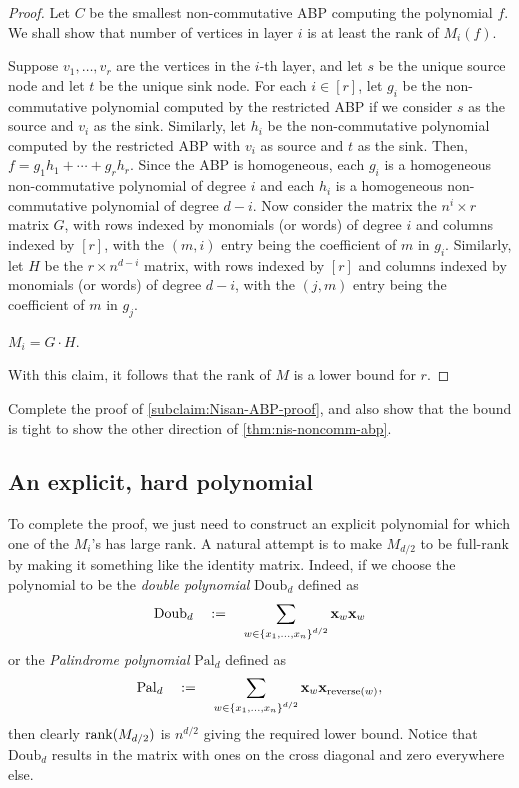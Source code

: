 \begin{proof}
Let $C$ be the smallest non-commutative ABP computing the polynomial $f$. We shall show that number of vertices in layer $i$ is at least the rank of $M_i(f)$. 

Suppose $v_1,\ldots, v_r$ are the vertices in the $i$-th layer, and let $s$ be the unique source node and let $t$ be the unique sink node.
For each $i \in [r]$, let $g_i$ be the non-commutative polynomial computed by the restricted ABP if we consider $s$ as the source and $v_i$ as the sink.
Similarly, let $h_i$ be the non-commutative polynomial computed by the restricted ABP with $v_i$ as source and $t$ as the sink.
Then, $f = g_1 h_1 + \cdots + g_r h_r$.
Since the ABP is homogeneous, each $g_i$ is a homogeneous non-commutative polynomial of degree $i$ and each $h_i$ is a homogeneous non-commutative polynomial of degree $d-i$.
Now consider the matrix the $n^i \times r$ matrix $G$, with rows indexed by monomials (or words) of degree $i$ and columns indexed by $[r]$, with the $(m,i)$ entry being the coefficient of $m$ in $g_i$.
Similarly, let $H$ be the $r \times n^{d-i}$ matrix, with rows indexed by $[r]$ and columns indexed by monomials (or words) of degree $d-i$, with the $(j,m)$ entry being the coefficient of $m$ in $g_j$.
\begin{subclaim}\label{subclaim:Nisan-ABP-proof}
$M_i = G \cdot H$. 
\end{subclaim}
\noindent 
With this claim, it follows that the rank of $M$ is a lower bound for $r$. 
\end{proof}

\begin{exercise}
Complete the proof of  \autoref{subclaim:Nisan-ABP-proof}, and also show that the bound is tight to show the other direction of \autoref{thm:nis-noncomm-abp}. 
\end{exercise}

\subsection{An explicit, hard polynomial}

To complete the proof, we just need to construct an explicit polynomial for which one of the $M_i$'s has large rank.
A natural attempt is to make $M_{d/2}$ to be full-rank by making it something like the identity matrix.
Indeed, if we choose the polynomial to be the \emph{double polynomial} $\mathrm{Doub}_d$ defined as
\[
\mathrm{Doub}_d \quad := \quad \sum_{w\in \left\{x_1, \ldots, x_n\right\}^{d/2}} \mathbf{x}_{w} \mathbf{x}_w
\]
or the \emph{Palindrome polynomial} $\mathrm{Pal}_d$ defined as
\[
\mathrm{Pal}_d \quad := \quad \sum_{w\in \left\{x_1, \ldots, x_n\right\}^{d/2}} \mathbf{x}_{w} \mathbf{x}_{\mathrm{reverse}(w)},
\]
then clearly $\operatorname{rank}(M_{d/2})$ is $n^{d/2}$ giving the required lower bound. Notice that $\mathrm{Doub}_d$ results in the
matrix with ones on the cross diagonal and zero everywhere else.

